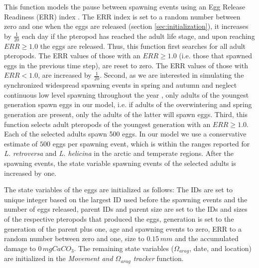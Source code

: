 This function models the pause between spawning events using an Egg Release Readiness (ERR) index \citep[similar to the Clutch Readiness Fraction presented in ][]{Miller1998CalanusIBM}. The ERR index is set to a random number between zero and one when the eggs are released (section \ref{sec:initialization}), it increases by $\frac{1}{20}$ each day if the pteropod has reached the adult life stage, and upon reaching $ERR \geq 1.0$ the eggs are released. Thus, this function first searches for all adult pteropods. The ERR values of those with an $ERR \geq 1.0$ (i.e. those that spawned eggs in the previous time step), are reset to zero. The ERR values of those with $ERR < 1.0$, are increased by $\frac{1}{20}$. Second, as we are interested in simulating the synchronized widespread spawning events in spring and autumn \citep{lalli1989pelagic,Thabet2015Lifestages,Wang2017Lifecycle} and neglect continuous low level spawning throughout the year \citep{Wang2017Lifecycle,Thabet2015Lifestages}, only adults of the youngest generation spawn eggs in our model, i.e. if adults of the overwintering and spring generation are present, only the adults of the latter will spawn eggs. Third, this function selects adult pteropods of the youngest generation with an $ERR \geq 1.0$. Each of the selected adults spawn 500 eggs. In our model we use a conservative estimate of $500$ eggs per spawning event, which is within the ranges reported for \textit{L. retroversa} and \textit{L. helicina} in the arctic and temperate regions. After the spawning events, the state variable spawning events of the selected adults is increased by one.

The state variables of the eggs are initialized as follows: The IDs are set to unique integer based on the largest ID used before the spawning events and the number of eggs released, parent IDs and parent size are set to the IDs and sizes of the respective pteropods that produced the eggs, generation is set to the generation of the parent plus one, age and spawning events to zero, ERR to a random number between zero and one, size to $0.15\, mm$ \citep{Wang2017Lifecycle} and the accumulated damage to $0 \, mg CaCO_3$. The remaining state variables ($\Omega_{arag}$, date, and location) are initialized in the \textit{Movement and $\Omega_{arag}$ tracker} function.







